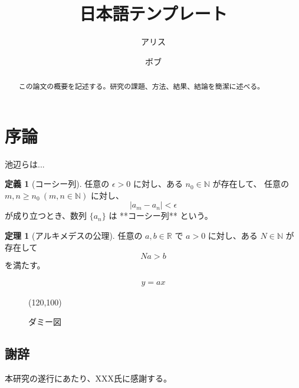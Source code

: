 \documentclass[12pt,dvipdfmx]{jlreq} %
\title{日本語テンプレート}
\author[1]{アリス}
\author[1,2]{ボブ}
\affil[1]{XXX大学}
\affil[2]{YYY大学}
\date{\empty}
\theoremstyle{definition}
\newtheorem{dfn}{定義}
\newtheorem{thm}{定理}
\begin{document}
\maketitle

\begin{abstract}
この論文の概要を記述する。研究の課題、方法、結果、結論を簡潔に述べる。
\end{abstract}

\section*{序論}
池辺らは...\cite{Ikebe2016-sg}

\begin{dfn}[コーシー列]
任意の $\epsilon > 0$ に対し、ある $n_0 \in \mathbb{N}$ が存在して、
任意の $m, n \geq n_0 \ (m,n \in \mathbb{N})$ に対し、
\[
\lvert a_m  - a_n  \rvert < \epsilon
\]
が成り立つとき、数列 $\{a_n\}$ は **コーシー列** という。
\end{dfn}	

\begin{thm}[アルキメデスの公理]
任意の $a, b \in \mathbb{R}$ で $a > 0$ に対し、ある $N \in \mathbb{N}$ が存在して
\[
Na > b
\]
を満たす。
\end{thm}

\begin{align}
y=ax
\end{align}

\begin{figure}[htbp]
    \centering
    \framebox(120,100){} 
    \caption{ダミー図}
    \label{fig:dummy}
\end{figure}

\subsection*{謝辞}
本研究の遂行にあたり、XXX氏に感謝する。

\end{document}
